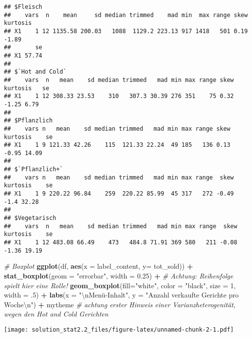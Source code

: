 \documentclass[]{article}
\newenvironment{Shaded}{\begin{snugshade}}{\end{snugshade}}
\newcommand{\CharTok}[1]{\textcolor[rgb]{0.31,0.60,0.02}{#1}}
\newcommand{\CommentTok}[1]{\textcolor[rgb]{0.56,0.35,0.01}{\textit{#1}}}
\newcommand{\DataTypeTok}[1]{\textcolor[rgb]{0.13,0.29,0.53}{#1}}
\newcommand{\DecValTok}[1]{\textcolor[rgb]{0.00,0.00,0.81}{#1}}
\newcommand{\FloatTok}[1]{\textcolor[rgb]{0.00,0.00,0.81}{#1}}
\newcommand{\KeywordTok}[1]{\textcolor[rgb]{0.13,0.29,0.53}{\textbf{#1}}}
\newcommand{\NormalTok}[1]{#1}
\newcommand{\OperatorTok}[1]{\textcolor[rgb]{0.81,0.36,0.00}{\textbf{#1}}}
\newcommand{\StringTok}[1]{\textcolor[rgb]{0.31,0.60,0.02}{#1}}
\begin{document}
\begin{verbatim}
## $Fleisch
##    vars  n    mean     sd median trimmed    mad min  max range skew kurtosis
## X1    1 12 1135.58 200.03   1088  1129.2 223.13 917 1418   501 0.19    -1.89
##       se
## X1 57.74
## 
## $`Hot and Cold`
##    vars  n   mean    sd median trimmed   mad min max range skew kurtosis   se
## X1    1 12 308.33 23.53    310   307.3 30.39 276 351    75 0.32    -1.25 6.79
## 
## $Pflanzlich
##    vars n   mean    sd median trimmed   mad min max range skew kurtosis    se
## X1    1 9 121.33 42.26    115  121.33 22.24  49 185   136 0.13    -0.95 14.09
## 
## $`Pflanzlich+`
##    vars n   mean    sd median trimmed   mad min max range  skew kurtosis    se
## X1    1 9 220.22 96.84    259  220.22 85.99  45 317   272 -0.49     -1.4 32.28
## 
## $Vegetarisch
##    vars  n   mean    sd median trimmed   mad min max range  skew kurtosis    se
## X1    1 12 483.08 66.49    473   484.8 71.91 369 580   211 -0.08    -1.36 19.19
\end{verbatim}

\begin{Shaded}
\begin{Highlighting}[]
\CommentTok{# Boxplot}
\KeywordTok{ggplot}\NormalTok{(df, }\KeywordTok{aes}\NormalTok{(}\DataTypeTok{x =}\NormalTok{ label_content, }\DataTypeTok{y=}\NormalTok{ tot_sold)) }\OperatorTok{+}\StringTok{ }
\StringTok{  }\KeywordTok{stat_boxplot}\NormalTok{(}\DataTypeTok{geom =} \StringTok{"errorbar"}\NormalTok{, }\DataTypeTok{width =} \FloatTok{0.25}\NormalTok{) }\OperatorTok{+}\StringTok{ }\CommentTok{# Achtung: Reihenfolge spielt hier eine Rolle!}
\StringTok{  }\KeywordTok{geom_boxplot}\NormalTok{(}\DataTypeTok{fill=}\StringTok{"white"}\NormalTok{, }\DataTypeTok{color =} \StringTok{"black"}\NormalTok{, }\DataTypeTok{size =} \DecValTok{1}\NormalTok{, }\DataTypeTok{width =} \FloatTok{.5}\NormalTok{) }\OperatorTok{+}
\StringTok{  }\KeywordTok{labs}\NormalTok{(}\DataTypeTok{x =} \StringTok{"}\CharTok{\textbackslash{}n}\StringTok{Menü-Inhalt"}\NormalTok{, }\DataTypeTok{y =} \StringTok{"Anzahl verkaufte Gerichte pro Woche}\CharTok{\textbackslash{}n}\StringTok{"}\NormalTok{) }\OperatorTok{+}\StringTok{ }
\StringTok{  }\NormalTok{mytheme }\CommentTok{# achtung erster Hinweis einer Varianzheterogenität, wegen den Hot and Cold Gerichten}
\end{Highlighting}
\end{Shaded}

\texttt{[image: solution\_stat2.2\_files/figure-latex/unnamed-chunk-2-1.pdf]}
\end{document}
